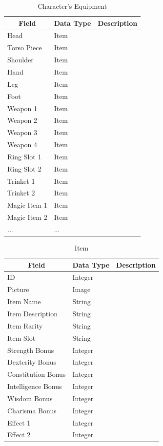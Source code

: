 \documentclass[12pt,letterpaper]{article}
\begin{document}
	\begin{table}[h]
		\centering
		\begin{tabular}{| l | l | p{7cm} |}
			\hline
			\multicolumn{1}{|c|}{\bf{Field}} & \multicolumn{1}{|c|}{\bf{Data Type}} & \multicolumn{1}{|c|}{\bf{Description}}\\ \hline
			Head & Item & \\ \hline
			Torso Piece & Item & \\ \hline
			Shoulder & Item & \\ \hline
			Hand & Item & \\ \hline
			Leg & Item & \\ \hline
			Foot & Item & \\ \hline
			Weapon 1 & Item & \\ \hline
			Weapon 2 & Item & \\ \hline
			Weapon 3 & Item & \\ \hline
			Weapon 4 & Item & \\ \hline
			Ring Slot 1 & Item & \\ \hline
			Ring Slot 2 & Item & \\ \hline
			Trinket 1 & Item & \\ \hline
			Trinket 2 & Item & \\ \hline
			Magic Item 1 & Item & \\ \hline
			Magic Item 2 & Item & \\ \hline
			... & ... & \\ \hline
		\end{tabular}
		\caption{Character's Equipment}
		\label{tab:tableCharacterEquipment}
	\end{table}			

	\begin{table}[h]
		\begin{tabular}{| l | l | p{7cm} |}
			\hline
			\multicolumn{1}{|c|}{\bf{Field}} & \multicolumn{1}{|c|}{\bf{Data Type}} & \multicolumn{1}{|c|}{\bf{Description}}\\ \hline
			ID & Integer & \\ \hline
			Picture & Image & \\ \hline
			Item Name & String & \\ \hline
			Item Description & String & \\ \hline
			Item Rarity & String & \\ \hline
			Item Slot & String & \\ \hline
			Strength Bonus & Integer & \\ \hline
			Dexterity Bonus & Integer & \\ \hline
			Constitution Bonus & Integer & \\ \hline
			Intelligence Bonus & Integer & \\ \hline
			Wisdom Bonus & Integer & \\ \hline
			Charisma Bonus & Integer & \\ \hline
			Effect 1 & Integer & \\ \hline
			Effect 2 & Integer & \\ \hline
			
		\end{tabular}
		\caption{Item}	
		\label{tab:tableItem}
	\end{table}
\end{document}
